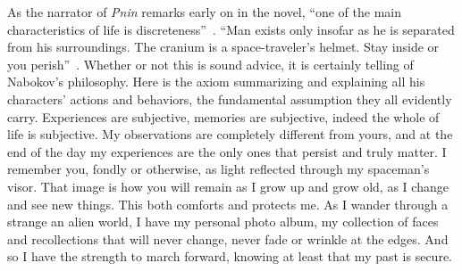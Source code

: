 As the narrator of \emph{Pnin} remarks early on in the novel, ``one of the main characteristics of life is discreteness''~\cite[12]{pnin}.
``Man exists only insofar as he is separated from his surroundings. The cranium is a space-traveler's helmet. Stay inside or you perish''~\cite[12]{pnin}.
Whether or not this is sound advice, it is certainly telling of Nabokov's philosophy.
Here is the axiom summarizing and explaining all his characters' actions and behaviors, the fundamental assumption they all evidently carry.
Experiences are subjective, memories are subjective, indeed the whole of life is subjective.
My observations are completely different from yours, and at the end of the day my experiences are the only ones that persist and truly matter.
I remember you, fondly or otherwise, as light reflected through my spaceman's visor.
That image is how you will remain as I grow up and grow old, as I change and see new things.
This both comforts and protects me.
As I wander through a strange an alien world, I have my personal photo album, my collection of faces and recollections that will never change, never fade or wrinkle at the edges.
And so I have the strength to march forward, knowing at least that my past is secure.


